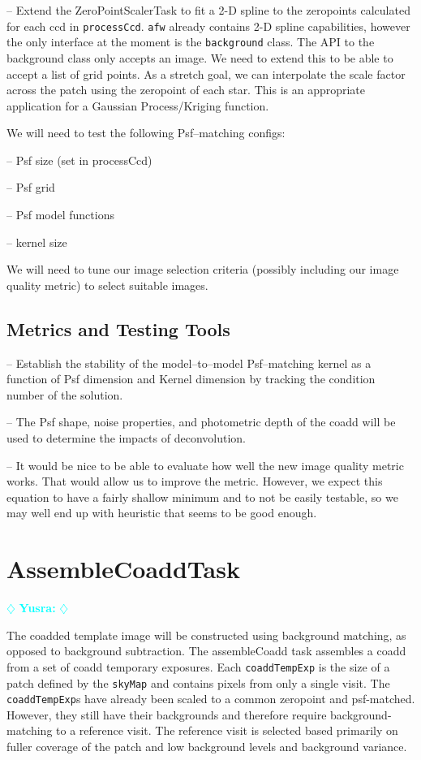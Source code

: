 \documentclass[prd, nofootinbib, floatfix, 11pt,tightenlines,times]{article}
\newcommand{\yusra} { \textcolor{cyan} {
\ensuremath{\diamondsuit} {\bf Yusra:}  
\ensuremath{\diamondsuit} } }
\begin{document}
--  Extend the ZeroPointScalerTask to fit a 2-D spline to the zeropoints calculated for each ccd in {\tt processCcd}.   {\tt afw} already contains 2-D spline capabilities, however the only interface at the moment is the {\tt background} class. The API to the background class only accepts an image. We need to extend this  to be able to accept a list of grid points.   As a stretch goal, we can  interpolate the scale factor across the patch using the zeropoint of each star. This is an appropriate application for a Gaussian Process/Kriging function. 

We will need to test the following Psf--matching configs:

-- Psf size (set in processCcd)

-- Psf grid 

-- Psf model functions

-- kernel size

We will need to tune our image selection criteria (possibly including our image quality metric)
to select suitable images.

\subsection{Metrics and Testing Tools}

-- Establish the stability of the model--to--model Psf--matching
kernel as a function of Psf dimension and Kernel dimension by tracking
the condition number of the solution.

-- The Psf shape, noise properties, and photometric depth of the coadd
will be used to determine the impacts of deconvolution.

-- It would be nice to be able to evaluate how well the new image quality metric
works. That would allow us to improve the metric. However, we expect this equation
to have a fairly shallow minimum and to not be easily testable, so we may well end up
with heuristic that seems to be good enough.


\clearpage 
\section{AssembleCoaddTask} \yusra

The coadded template image will be constructed using background
matching, as opposed to background subtraction. The assembleCoadd task assembles a coadd from a set of coadd temporary exposures.   Each {\tt coaddTempExp} is the size of a patch defined by the {\tt skyMap} and contains pixels from only a single visit.  The {\tt coaddTempExp}s have already been scaled to a common zeropoint and psf-matched.  However, they still have their backgrounds and therefore require background-matching to a reference visit. The reference visit is selected based primarily on fuller coverage of the patch and low background levels and background variance. 
\end{document}
